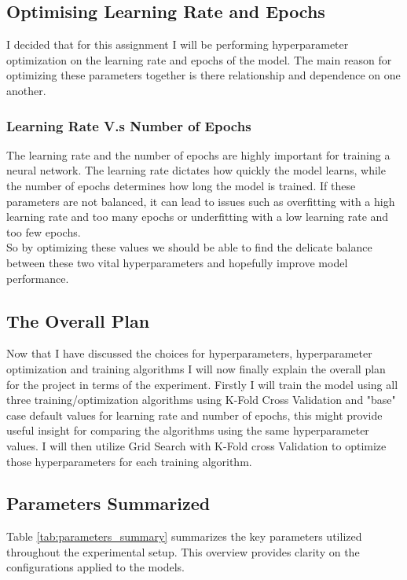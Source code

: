 \documentclass[conference]{IEEEtran}
\begin{document}
\subsection{Optimising Learning Rate and Epochs}
I decided that for this assignment I will be performing hyperparameter optimization on the learning rate and epochs of the model. The main reason for optimizing these parameters together is there relationship and dependence on one another.

\subsubsection{Learning Rate V.s Number of Epochs}
The learning rate and the number of epochs are highly important for training a neural network. The learning rate dictates how quickly the model learns, while the number of epochs determines how long the model is trained. If these parameters are not balanced, it can lead to issues such as overfitting with a high learning rate and too many epochs or underfitting with a low learning rate and too few epochs.\\

So by optimizing these values we should be able to find the delicate balance between these two vital hyperparameters and hopefully improve model performance.

\subsection{The Overall Plan}
Now that I have discussed the choices for hyperparameters, hyperparameter optimization and training algorithms I will now finally explain the overall plan for the project in terms of the experiment. Firstly I will train the model using all three training/optimization algorithms using K-Fold Cross Validation and "base" case default values for learning rate and number of epochs, this might provide useful insight for comparing the algorithms using the same hyperparameter values. I will then utilize Grid Search with K-Fold cross Validation to optimize those hyperparameters for each training algorithm.

\subsection{Parameters Summarized}

Table \ref{tab:parameters_summary} summarizes the key parameters utilized throughout the experimental setup. This overview provides clarity on the configurations applied to the models.
\end{document}
